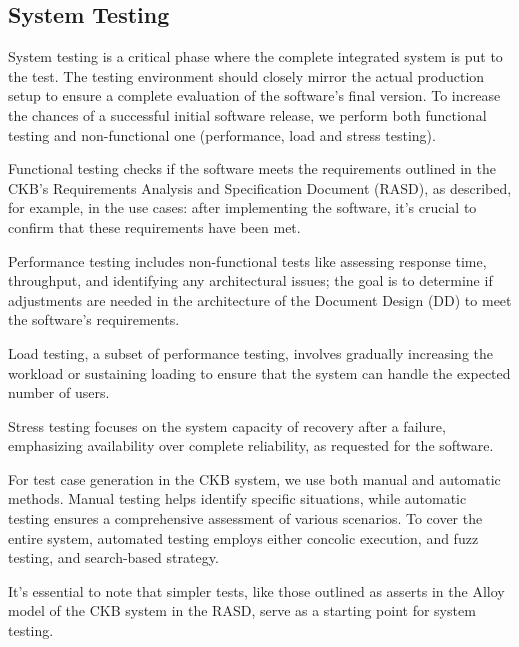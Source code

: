 
\subsection{System Testing}

System testing is a critical phase where the complete integrated system is put to the test. The testing environment should closely mirror the actual production setup to ensure a complete evaluation of the software's final version. To increase the chances of a successful initial software release, we perform both functional testing and non-functional one (performance, load and stress testing). 

Functional testing checks if the software meets the requirements outlined in the CKB's Requirements Analysis and Specification Document (RASD), as described, for example, in the use cases: after implementing the software, it's crucial to confirm that these requirements have been met.

Performance testing includes non-functional tests like assessing response time, throughput, and identifying any architectural issues; the goal is to determine if adjustments are needed in the architecture of the Document Design (DD) to meet the software's requirements. 

Load testing, a subset of performance testing, involves gradually increasing the workload or sustaining loading to ensure that the system can handle the expected number of users. 

Stress testing focuses on the system capacity of recovery after a failure, emphasizing availability over complete reliability, as requested for the software.

For test case generation in the CKB system, we use both manual and automatic methods. Manual testing helps identify specific situations, while automatic testing ensures a comprehensive assessment of various scenarios. To cover the entire system, automated testing employs either concolic execution, and fuzz testing, and search-based strategy.

It's essential to note that simpler tests, like those outlined as asserts in the Alloy model of the CKB system in the RASD, serve as a starting point for system testing.\

